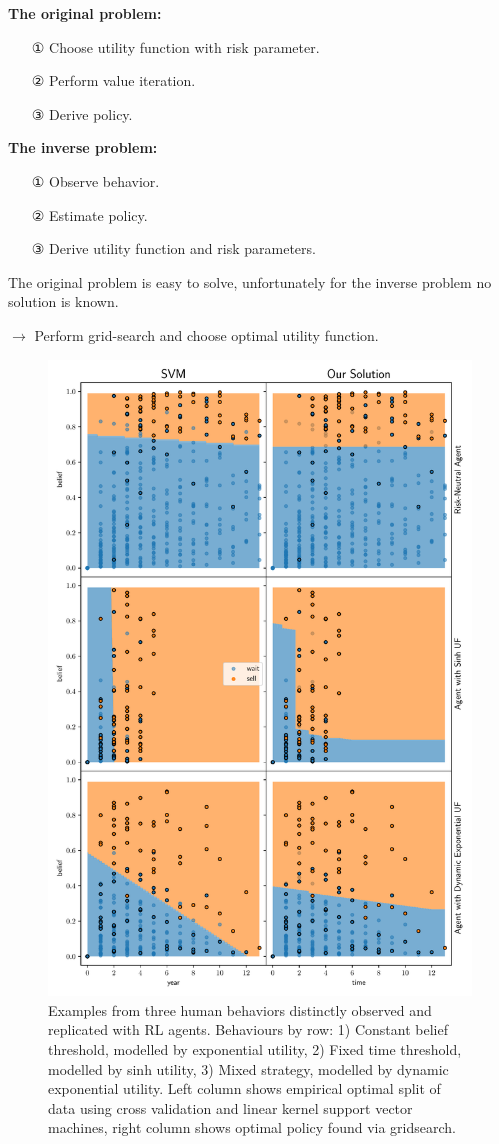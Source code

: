 \normalsize
\textbf{The original problem:}
\begin{itemize}
\item[①] Choose utility function with risk parameter.
\item[②] Perform value iteration.
\item[③] Derive policy.
\end{itemize}

\textbf{The inverse problem:}
\begin{itemize}
\item[①] Observe behavior.
\item[②] Estimate policy.
\item[③] Derive utility function and risk parameters.
\end{itemize}

The original problem is easy to solve, unfortunately for the inverse problem no solution is known. 

$\rightarrow$ Perform grid-search and choose optimal utility function.

\begin{figure}
    \centering
    \includegraphics[width=0.8\linewidth]{img/fit}
    \caption{Examples from three human behaviors distinctly observed and replicated with RL agents. Behaviours by row: 1) Constant belief threshold, modelled by exponential utility, 2) Fixed time threshold, modelled by sinh utility, 3) Mixed strategy, modelled by dynamic exponential utility. Left column shows empirical optimal split of data using cross validation and linear kernel support vector machines, right column shows optimal policy found via gridsearch.}
    \label{fig:svm_vs_value}
\end{figure}

